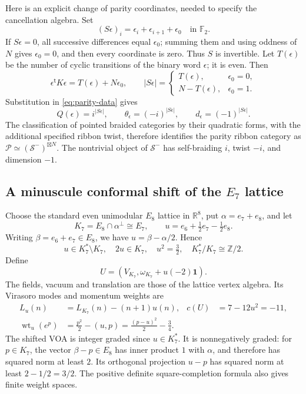 \documentclass[11pt,a4paper]{article}
\numberwithin{equation}{section}
\theoremstyle{definition}\newtheorem{definition}[theorem]{Definition}
\theoremstyle{remark}\newtheorem{remark}[theorem]{Remark}
\begin{document}
Here is an explicit change of parity coordinates, needed to specify
the cancellation algebra. Set
\[
 (S\epsilon)_i=\epsilon_i+\epsilon_{i+1}+\epsilon_0
 \quad\text{in }\mathbb F_2.
\]
If $S\epsilon=0$, all successive differences equal $\epsilon_0$;
summing them and using oddness of $N$ gives $\epsilon_0=0$, and
then every coordinate is zero. Thus $S$ is invertible.
Let $T(\epsilon)$ be the number of cyclic transitions of the binary
word $\epsilon$; it is even. Then
\[
 \epsilon^{\mathsf t}K\epsilon=T(\epsilon)+N\epsilon_0,
 \qquad |S\epsilon|=
 \begin{cases}
 T(\epsilon),&\epsilon_0=0,\\
 N-T(\epsilon),&\epsilon_0=1.
 \end{cases}
\]
Substitution in \eqref{eq:parity-data} gives
\begin{equation}\label{eq:semion-coordinates}
 Q(\epsilon)=i^{|S\epsilon|},\qquad
 \theta_\epsilon=(-i)^{|S\epsilon|},\qquad
 d_\epsilon=(-1)^{|S\epsilon|}.
\end{equation}
The classification of pointed braided categories by their quadratic
forms, with the additional specified ribbon twist, therefore identifies
the parity ribbon category as
$\mathcal P\simeq(\mathcal S^-)^{\boxtimes N}$.
The nontrivial object of $\mathcal S^-$ has self-braiding $i$,
twist $-i$, and dimension $-1$.

\subsection{A minuscule conformal shift of the \texorpdfstring{$E_7$}{E7} lattice}

Choose the standard even unimodular $E_8$ lattice in $\mathbb R^8$,
put $\alpha=e_7+e_8$, and let
\[
 K_7=E_8\cap\alpha^\perp\cong E_7,\qquad
 u=e_6+\tfrac12e_7-\tfrac12e_8.
\]
Writing $\beta=e_6+e_7\in E_8$, we have $u=\beta-\alpha/2$.
Hence
\[
 u\in K_7^*\setminus K_7,\quad 2u\in K_7,
 \quad u^2=\tfrac32,
 \quad K_7^*/K_7\cong\mathbb Z/2.
\]
Define
\[
 U=(V_{K_7},\omega_{K_7}+u(-2)\mathbf1).
\]
The fields, vacuum and translation are those of the lattice vertex
algebra. Its Virasoro modes and momentum weights are
\begin{align*}
 L_u(n)&=L_{K_7}(n)-(n+1)u(n),&
 c(U)&=7-12u^2=-11,\\
 \operatorname{wt}_u(e^p)
 &=\frac{p^2}{2}-(u,p)
 =\frac{(p-u)^2}{2}-\frac34.
\end{align*}
The shifted VOA is integer graded since $u\in K_7^*$.
It is nonnegatively graded: for $p\in K_7$, the vector
$\beta-p\in E_8$ has inner product $1$ with $\alpha$, and therefore
has squared norm at least $2$. Its orthogonal projection $u-p$ has
squared norm at least $2-1/2=3/2$.
The positive definite square-completion formula also gives finite
weight spaces.
\end{document}

